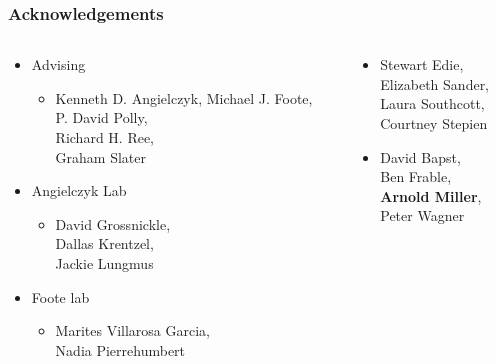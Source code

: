 \documentclass{beamer}
\begin{document}
\begin{frame}
  \frametitle{Acknowledgements}
  \begin{columns}
    \begin{column}{0.5\textwidth}
      \begin{itemize}
        \item Advising
          \begin{itemize}
            \item Kenneth D. Angielczyk, Michael J. Foote, \\P. David Polly, \\Richard H. Ree, \\Graham Slater
          \end{itemize}
        \item Angielczyk Lab
          \begin{itemize}
            \item {\small{David Grossnickle, \\Dallas Krentzel, \\Jackie Lungmus}}
          \end{itemize}
        \item Foote lab
          \begin{itemize}
            \item {\small{Marites Villarosa Garcia, \\Nadia Pierrehumbert}}
          \end{itemize}
      \end{itemize}
    \end{column}
    \begin{column}{0.5\textwidth}
      \begin{itemize}
        \item {\footnotesize{Stewart Edie, \\Elizabeth Sander, \\Laura Southcott, \\Courtney Stepien}}
        \item {\footnotesize{David Bapst, \\Ben Frable, \\\textbf{Arnold Miller}, \\Peter Wagner}}
      \end{itemize}
      

\end{column}
\end{columns}
\end{frame}
\end{document}
